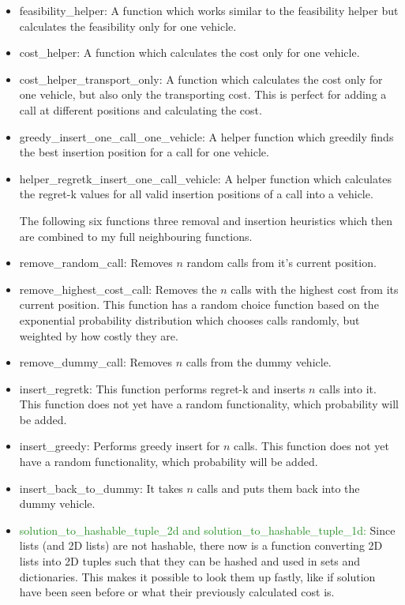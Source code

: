 \documentclass[a4paper,11pt]{article}
\theoremstyle{mytheor}
\begin{document}
\begin{itemize}
\item feasibility\_helper: A function which works similar to the feasibility helper but calculates the feasibility only for one vehicle.
\item cost\_helper: A function which calculates the cost only for one vehicle.
\item cost\_helper\_transport\_only: A function which calculates the cost only for one vehicle, but also only the transporting cost. This is perfect for adding a call at different positions and calculating the cost.
\item greedy\_insert\_one\_call\_one\_vehicle: A helper function which greedily finds the best insertion position for a call for one vehicle.
\item helper\_regretk\_insert\_one\_call\_vehicle: A helper function which calculates the regret-k values for all valid insertion positions of a call into a vehicle.

The following six functions three removal and insertion heuristics which then are combined to my full neighbouring functions.
\item remove\_random\_call: Removes $n$ random calls from it's current position.
\item remove\_highest\_cost\_call: Removes the $n$ calls with the highest cost from its current position. This function has a random choice function based on the exponential probability distribution which chooses calls randomly, but weighted by how costly they are.
\item remove\_dummy\_call: Removes $n$ calls from the dummy vehicle.
\item insert\_regretk: This function performs regret-k and inserts $n$ calls into it. This function does not yet have a random functionality, which probability will be added.
\item insert\_greedy: Performs greedy insert for $n$ calls. This function does not yet have a random functionality, which probability will be added.
\item insert\_back\_to\_dummy: It takes $n$ calls and puts them back into the dummy vehicle.
\item \textcolor{ForestGreen}{solution\_to\_hashable\_tuple\_2d and solution\_to\_hashable\_tuple\_1d: }Since lists (and 2D lists) are not hashable, there now is a function converting 2D lists into 2D tuples such that they can be hashed and used in sets and dictionaries. This makes it possible to look them up fastly, like if solution have been seen before or what their previously calculated cost is.
\end{itemize}\medskip
\end{document}
